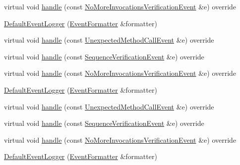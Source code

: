 \begin{DoxyCompactItemize}
\item 
virtual void \mbox{\hyperlink{structfakeit_1_1DefaultEventLogger_ac2df9faf9057e440c0aa314f54ce6f1c}{handle}} (const \mbox{\hyperlink{structfakeit_1_1NoMoreInvocationsVerificationEvent}{No\+More\+Invocations\+Verification\+Event}} \&e) override
\item 
\mbox{\hyperlink{structfakeit_1_1DefaultEventLogger_a20fe9266e4a323b5fc282d797fe7ecfd}{Default\+Event\+Logger}} (\mbox{\hyperlink{structfakeit_1_1EventFormatter}{Event\+Formatter}} \&formatter)
\item 
virtual void \mbox{\hyperlink{structfakeit_1_1DefaultEventLogger_a4bbb520dfe6bf042d7f0380e7b400bce}{handle}} (const \mbox{\hyperlink{structfakeit_1_1UnexpectedMethodCallEvent}{Unexpected\+Method\+Call\+Event}} \&e) override
\item 
virtual void \mbox{\hyperlink{structfakeit_1_1DefaultEventLogger_a730fe776b90249dd62d750a7d6171f90}{handle}} (const \mbox{\hyperlink{structfakeit_1_1SequenceVerificationEvent}{Sequence\+Verification\+Event}} \&e) override
\item 
virtual void \mbox{\hyperlink{structfakeit_1_1DefaultEventLogger_ac2df9faf9057e440c0aa314f54ce6f1c}{handle}} (const \mbox{\hyperlink{structfakeit_1_1NoMoreInvocationsVerificationEvent}{No\+More\+Invocations\+Verification\+Event}} \&e) override
\item 
\mbox{\hyperlink{structfakeit_1_1DefaultEventLogger_a20fe9266e4a323b5fc282d797fe7ecfd}{Default\+Event\+Logger}} (\mbox{\hyperlink{structfakeit_1_1EventFormatter}{Event\+Formatter}} \&formatter)
\item 
virtual void \mbox{\hyperlink{structfakeit_1_1DefaultEventLogger_a4bbb520dfe6bf042d7f0380e7b400bce}{handle}} (const \mbox{\hyperlink{structfakeit_1_1UnexpectedMethodCallEvent}{Unexpected\+Method\+Call\+Event}} \&e) override
\item 
virtual void \mbox{\hyperlink{structfakeit_1_1DefaultEventLogger_a730fe776b90249dd62d750a7d6171f90}{handle}} (const \mbox{\hyperlink{structfakeit_1_1SequenceVerificationEvent}{Sequence\+Verification\+Event}} \&e) override
\item 
virtual void \mbox{\hyperlink{structfakeit_1_1DefaultEventLogger_ac2df9faf9057e440c0aa314f54ce6f1c}{handle}} (const \mbox{\hyperlink{structfakeit_1_1NoMoreInvocationsVerificationEvent}{No\+More\+Invocations\+Verification\+Event}} \&e) override
\item 
\mbox{\hyperlink{structfakeit_1_1DefaultEventLogger_a20fe9266e4a323b5fc282d797fe7ecfd}{Default\+Event\+Logger}} (\mbox{\hyperlink{structfakeit_1_1EventFormatter}{Event\+Formatter}} \&formatter)

\end{DoxyCompactItemize}
